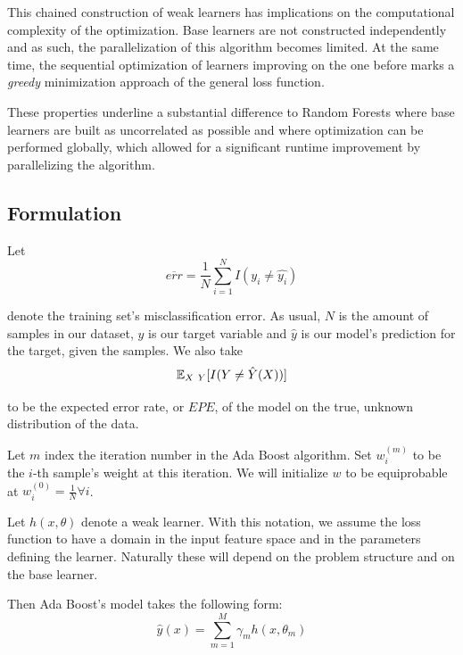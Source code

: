 This chained construction of weak learners has implications on the computational complexity of the optimization.
Base learners are not constructed independently and as such, the parallelization of this algorithm becomes limited.
At the same time, the sequential optimization of learners improving on the one before marks a \textit{greedy} minimization approach of the general loss function.

These properties underline a substantial difference to Random Forests where base learners are built as uncorrelated as possible and where optimization can be performed globally, which allowed for a significant runtime improvement by parallelizing the algorithm.

\subsection{Formulation}\label{subsection:adaboost_formulation}

Let
\begin{equation}\label{eq:adaBoostTrainingError}
\overline{err} = \frac{1}{N} \sum_{i=1}^{N} I(y_i \neq \hat{y_i})
\end{equation}

denote the training set's misclassification error.
As usual, $N$ is the amount of samples in our dataset, $y$ is our target variable and $\hat{y}$ is our model's prediction for the target, given the samples.
We also take
\begin{equation}
\operatorname{\mathbb{E}}_{X \ Y} [ I(Y \neq \hat{Y}(X)) ]
\end{equation}

to be the expected error rate, or $EPE$, of the model on the true, unknown distribution of the data.

Let $m$ index the iteration number in the Ada Boost algorithm.
Set $w^{(m)}_i$ to be the $i$-th sample's weight at this iteration.
We will initialize $w$ to be equiprobable at $w^{(0)}_i = \frac{1}{N} \forall i$.

Let $h(x,\theta)$ denote a weak learner.
With this notation, we assume the loss function to have a domain in the input feature space and in the parameters defining the learner.
Naturally these will depend on the problem structure and on the base learner.

Then Ada Boost's model takes the following form:
\begin{equation}\label{eq:adaBoostModel}
\hat{y}(x) = \sum_{m=1}^{M} \gamma_m h(x,\theta_m)
\end{equation}


